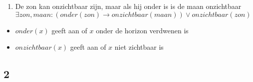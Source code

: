 \documentclass[]{article}
\begin{document}
\begin{enumerate}[a]
\begin{enumerate}[i]
\begin{enumerate}[1]
        \item De zon kan onzichtbaar zijn, maar als hij onder is is de maan onzichtbaar \\ $\exists zon, maan : (onder(zon) \longrightarrow onzichtbaar(maan))\lor onzichtbaar(zon)$
      \end{enumerate}
      \begin{itemize}
        \item $onder(x)$ geeft aan of $x$ onder de horizon verdwenen is
        \item $onzichtbaar(x)$ geeft aan of $x$ niet zichtbaar is
      \end{itemize}
    \end{enumerate} %
  \end{enumerate}

  \subsection*{2}
\end{document}

